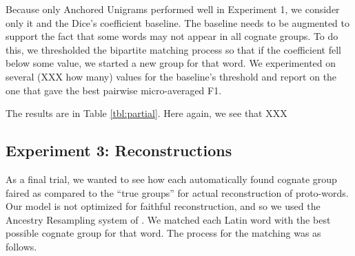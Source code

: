 \documentclass[11pt,a4paper]{article}
\begin{document}
Because only Anchored Unigrams performed well in Experiment 1, we
consider only it and the Dice's coefficient baseline. The baseline
needs to be augmented to support the fact that some words may not
appear in all cognate groups. To do this, we thresholded the bipartite
matching process so that if the coefficient fell below some value,
we started a new group for that word. We experimented on several (XXX how many)
values for the baseline's threshold and report on the one that gave
the best pairwise micro-averaged F1.

The results are in Table \ref{tbl:partial}. Here again, we see that
XXX

\subsection{Experiment 3: Reconstructions}

As a final trial, we wanted to see how each automatically found
cognate group faired as compared to the ``true groups'' for actual
reconstruction of proto-words. Our model is not optimized for
faithful reconstruction, and so we used the Ancestry Resampling
system of . We matched each Latin word
with the best possible cognate group for that word. The process for
the matching was as follows.
\end{document}
